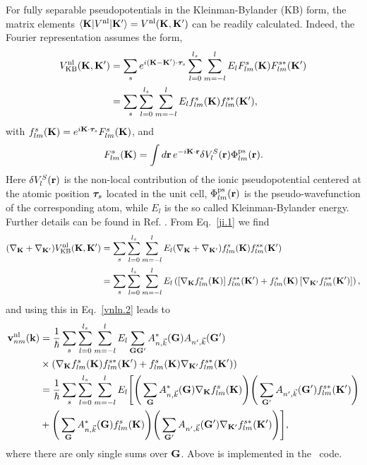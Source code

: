 For fully  separable pseudopotentials in the  
Kleinman-Bylander (KB) form,\cite{mottaCMS10,kleinman_efficacious_1982,adolphPRB96} 
the
matrix elements 
 $\langle \mathbf{K} |
V^{\mathrm{nl}}
| \mathbf{K}' \rangle
=V^{\mathrm{nl}}(\mathbf{K},\mathbf{K}')
$
can be readily calculated. \cite{mottaCMS10}
Indeed,
the Fourier representation assumes 
the form,\cite{adolphPRB96,gordienkoRPJ04,fuchsCPC99}
\begin{align}\label{ji.1} 
V^{\mathrm{nl}}_{\mathrm{KB}}(\mathbf{K},\mathbf{K}')  
 &= 
\sum_s e^{i(\mathbf{K}-\mathbf{K}')\cdot\boldsymbol{\tau}_s}
\sum_{l=0}^{l_s}\sum_{m=-l}^{l}E_lF_{lm}^s(\mathbf{K})F_{lm}^{s*}(\mathbf{K}')  
\nonumber\\
 &= 
\sum_s 
\sum_{l=0}^{l_s}\sum_{m=-l}^{l}E_lf_{lm}^s(\mathbf{K})f_{lm}^{s*}(\mathbf{K}')  
,
\end{align} 
with $f^s_{lm}(\mathbf{K})=e^{i\mathbf{K}\cdot\boldsymbol{\tau}_s}F^s_{lm}(\mathbf{K})$, and
\begin{align}\label{ji.2}
F^s_{lm}(\mathbf{K})=\int d\mathbf{r}\,e^{-i\mathbf{K}\cdot\mathbf{r}}
\delta V^S_l(\mathbf{r})
\Phi^{\mathrm{ps}}_{lm}(\mathbf{r}) 
.
\end{align}
Here $\delta V^S_l(\mathbf{r})$ is the non-local contribution of the ionic
pseudopotential centered at the atomic position $\boldsymbol{\tau}_s$ located in
the unit cell, 
$\Phi^{\mathrm{ps}}_{lm}(\mathbf{r})$ is the pseudo-wavefunction of the corresponding
atom, while $E_l$ is the so called 
Kleinman-Bylander energy. Further details can be found in
Ref. .
From Eq.~\eqref{ji.1} we find
\begin{align}\label{ji.1n}
(\nabla_{\mathbf{K}}+\nabla_{\mathbf{K}'})  
V^{\mathrm{nl}}_{\mathrm{KB}}(\mathbf{K},\mathbf{K}') 
 &= 
\sum_s 
\sum_{l=0}^{l_s}\sum_{m=-l}^{l}E_l 
(\nabla_{\mathbf{K}}+\nabla_{\mathbf{K}'})   
f_{lm}^s (\mathbf{K})f_{lm}^{s*}(\mathbf{K}') 
\nonumber\\
 &= 
\sum_s 
\sum_{l=0}^{l_s}\sum_{m=-l}^{l}E_l 
\left(\left[\nabla_{\mathbf{K}} f_{lm}^s (\mathbf{K})\right]f_{lm}^{s*}(\mathbf{K}') 
+
f_{lm}^s (\mathbf{K}) \left[\nabla_{\mathbf{K}'}  f_{lm}^{s*}(\mathbf{K}') \right]
\right),
\end{align}
and using this
 in Eq.~\eqref{vnln.2} leads to
\begin{align}\label{forg}
\mathbf{v}^{\mathrm{nl}}_{nm}(\mathbf{k})
&=
\frac{1}{\hbar}
\sum_s
\sum_{l=0}^{l_s}\sum_{m=-l}^{l}E_l \sum_{\mathbf{G}\mathbf{G}'}
A^*_{n,\vec{k}}(\mathbf{G})A_{n',\vec{k}}(\mathbf{G}')
\nonumber\\
&\times
( \nabla_{\mathbf{K}}f_{lm}^s(\mathbf{K})f_{lm}^{s*}(\mathbf{K}') +
f_{lm}^s(\mathbf{K})\nabla_{\mathbf{K}'}f_{lm}^{s*}(\mathbf{K}') ) \nonumber\\
&
=\frac{1}{\hbar}
 \sum_s \sum_{l=0}^{l_s}\sum_{m=-l}^{l}E_l \Bigg[
\Bigg(\sum_{\mathbf{G}}A^*_{n,\vec{k}}(\mathbf{G})\nabla_{\mathbf{K}}f_{lm}^s(\mathbf{K})\Bigg)
\Bigg(\sum_{\mathbf{G}'}A_{n',\vec{k}}(\mathbf{G}')
f_{lm}^{s*}(\mathbf{K}')\Bigg) \nonumber\\
&+
\Bigg(\sum_{\mathbf{G}}A^*_{n,\vec{k}}(\mathbf{G})
f_{lm}^s(\mathbf{K})\Bigg)\Bigg
(\sum_{\mathbf{G}'}A_{n',\vec{k}}(\mathbf{G}')
\nabla_{\mathbf{K}'}f_{lm}^{s*}(\mathbf{K}')\Bigg) \Bigg]
,
\end{align}
where there are only single sums over $\mathbf{G}$. 
Above is implemented in 
the \depe~code.\cite{francesco}

